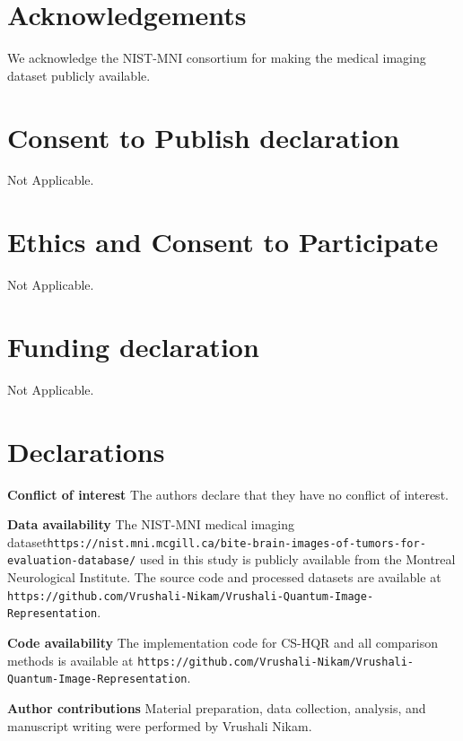\documentclass[11pt,a4paper]{article}
\begin{document}

\section*{Acknowledgements}
We acknowledge the NIST-MNI consortium for making the medical imaging dataset publicly available.
\section*{Consent to Publish declaration}
Not Applicable.
\section*{Ethics and Consent to Participate}
Not Applicable.
\section*{Funding declaration}
Not Applicable.

\section*{Declarations}

\noindent\textbf{Conflict of interest} The authors declare that they have no conflict of interest.

\noindent\textbf{Data availability} The NIST-MNI medical imaging dataset\texttt{https://nist.mni.mcgill.ca/bite-brain-images-of-tumors-for-evaluation-database/} used in this study is publicly available from the Montreal Neurological Institute. The source code and processed datasets are available at \texttt{https://github.com/Vrushali-Nikam/Vrushali-Quantum-Image-Representation}.

\noindent\textbf{Code availability} The implementation code for CS-HQR and all comparison methods is available at \texttt{https://github.com/Vrushali-Nikam/Vrushali-Quantum-Image-Representation}.

\noindent\textbf{Author contributions} Material preparation, data collection, analysis, and manuscript writing were performed by  Vrushali Nikam.
\end{document}
